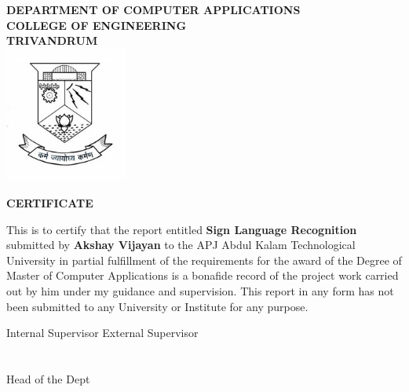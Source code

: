 \begin{titlepage}
\begin{center}

\textbf{DEPARTMENT OF COMPUTER APPLICATIONS}\\[0.5cm]
\textbf{ COLLEGE OF ENGINEERING \\ TRIVANDRUM}\\
[0.5cm]

\vspace{1.2cm}
\includegraphics[width=0.30\textwidth]{2.jpg}\\
\vspace{0.8cm}

\textbf{CERTIFICATE}\\
\end{center}

This is to certify that the report entitled 
\textbf{Sign Language Recognition} submitted by
\textbf{Akshay Vijayan} to the APJ Abdul Kalam Technological University in partial
fulfillment of the requirements for the award of the Degree of Master of
Computer Applications is a bonafide record of the project work carried out by
him under my guidance and supervision. This report in any form has not been
submitted to any University or Institute for any purpose.

\vspace{1 cm}

\noindent Internal Supervisor 
\hfill External Supervisor
\\ \\\\
Head of the Dept

\end{titlepage}
